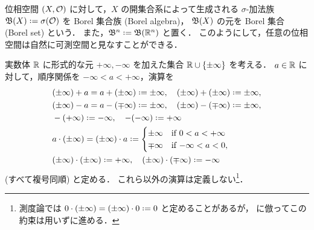 \begin{example}\label{ex:Borel_algebra}
    位相空間 $(X,\mathcal{O})$ に対して，$X$ の開集合系によって生成される $\sigma$-加法族
    $\Bfrak(X)\defeq\sigma(\Ocal)$ を Borel 集合族 (Borel algebra)，
    $\mathfrak{B}(X)$ の元を Borel 集合 (Borel set) という．
    また，$\Bfrak^n\defeq\Bfrak(\Rbb^n)$ と置く．
    このようにして，任意の位相空間は自然に可測空間と見なすことができる．
\end{example}

\begin{example}\label{ex:extended_real}
    実数体 $\mathbb{R}$ に形式的な元 $+\infty,-\infty$ を加えた集合 $\mathbb{R}\cup\{\pm\infty\}$ を考える．
    $a\in\mathbb{R}$ に対して，順序関係を $-\infty<a<+\infty$，演算を
    \begin{align*}
        &(\pm\infty)+a=a+(\pm\infty)\defeq\pm\infty,\quad
        (\pm\infty)+(\pm\infty)\defeq\pm\infty,\\
        &(\pm\infty)-a=a-(\mp\infty)\defeq\pm\infty,\quad
        (\pm\infty)-(\mp\infty)\defeq\pm\infty,\\
        &-(+\infty)\defeq-\infty,\quad
        -(-\infty)\defeq+\infty\\
        &a\cdot(\pm\infty)=(\pm\infty)\cdot a\defeq\begin{cases}
            \pm\infty&\text{if $0<a<+\infty$}\\
            \mp\infty&\text{if $-\infty<a<0$},
        \end{cases}\\
        &(\pm\infty)\cdot(\pm\infty)\defeq+\infty,\quad
        (\pm\infty)\cdot(\mp\infty)\defeq-\infty
    \end{align*}
    (すべて複号同順) と定める．
    これら以外の演算は定義しない\footnote{測度論では $0\cdot(\pm\infty)=(\pm\infty)\cdot0\defeq0$ と定めることがあるが，\cite[p.12]{It63} に倣ってこの約束は用いずに進める．}．


\end{example}
